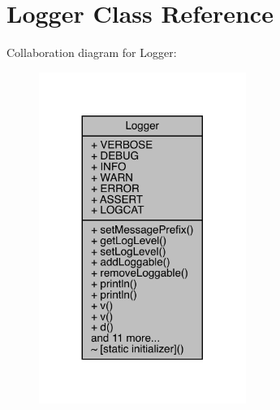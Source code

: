 \hypertarget{classcom_1_1toast_1_1android_1_1gamebase_1_1base_1_1log_1_1_logger}{}\section{Logger Class Reference}
\label{classcom_1_1toast_1_1android_1_1gamebase_1_1base_1_1log_1_1_logger}


Collaboration diagram for Logger\+:
\nopagebreak
\begin{figure}[H]
\begin{center}
\leavevmode
\includegraphics[width=191pt]{classcom_1_1toast_1_1android_1_1gamebase_1_1base_1_1log_1_1_logger__coll__graph}
\end{center}
\end{figure}
